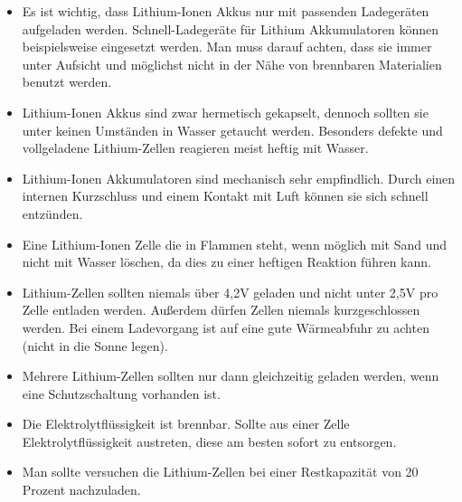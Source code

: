 \begin{itemize}
	\item{Es ist wichtig, dass Lithium-Ionen Akkus nur mit passenden Ladegeräten aufgeladen werden. Schnell-Ladegeräte für Lithium Akkumulatoren können beispielsweise eingesetzt werden. Man muss darauf achten, dass sie immer unter Aufsicht und möglichst nicht in der Nähe von brennbaren Materialien benutzt werden.} \medskip\\

	\item {Lithium-Ionen Akkus sind zwar hermetisch gekapselt, dennoch sollten sie unter keinen Umständen in Wasser getaucht werden. Besonders defekte und  vollgeladene Lithium-Zellen reagieren meist heftig mit Wasser.}\medskip\\
	
	\item {Lithium-Ionen Akkumulatoren sind mechanisch sehr empfindlich. Durch einen internen Kurzschluss und einem Kontakt mit Luft können sie sich schnell entzünden.}\medskip\\
	
	\item {Eine Lithium-Ionen Zelle die in Flammen steht, wenn möglich mit Sand und nicht mit Wasser löschen, da dies zu einer heftigen Reaktion führen kann.}\medskip\\
	
	\item {Lithium-Zellen sollten niemals über 4,2V geladen und nicht unter 2,5V pro Zelle entladen werden. Außerdem dürfen Zellen niemals kurzgeschlossen werden. Bei einem Ladevorgang ist auf eine gute Wärmeabfuhr zu achten (nicht in die Sonne legen).}\medskip\\
	
	\item {Mehrere Lithium-Zellen sollten nur dann gleichzeitig geladen werden, wenn eine Schutzschaltung vorhanden ist.}\medskip\\
	
	\item {Die Elektrolytflüssigkeit ist brennbar. Sollte aus einer Zelle Elektrolytflüssigkeit austreten, diese am besten sofort zu entsorgen.}\medskip\\
	
	\item {Man sollte versuchen die Lithium-Zellen bei einer Restkapazität von 20 Prozent nachzuladen.}\medskip\\

\end{itemize}
\newpage

